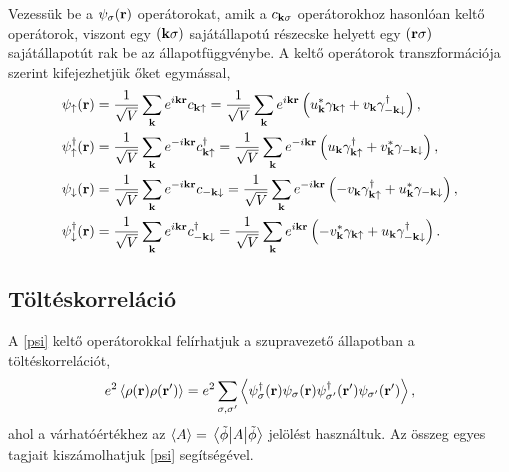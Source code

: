 \documentclass[a4paper,12pt,titlepage]{article}
\newcommand{\KK}{{\vb{k}}}
\newcommand{\RR}{{\vb{r}}}
\begin{document}
Vezessük be a $\psi_\sigma(\RR)$ operátorokat, amik a $c_{\KK \sigma}$ operátorokhoz hasonlóan keltő operátorok, viszont egy $\left( \KK \sigma \right)$ sajátállapotú részecske helyett egy $\left( \RR \sigma \right)$ sajátállapotút rak be az állapotfüggvénybe.  A keltő operátorok transzformációja szerint kifejezhetjük őket egymással,
\begin{equation} \label{psi}
\begin{split}
	\psi_\uparrow(\RR) & = \frac{1}{\sqrt{V}} \sum\limits_\KK e^{i \KK \RR} c_{\KK \uparrow} = \frac{1}{\sqrt{V}} \sum\limits_\KK e^{i \KK \RR} \left( u_\KK^* \gamma_{\KK \uparrow} + v_\KK \gamma_{-\KK \downarrow}^\dagger \right), \\
	\psi_\uparrow^\dagger(\RR) & = \frac{1}{\sqrt{V}} \sum\limits_\KK e^{-i \KK \RR} c_{\KK \uparrow}^\dagger = \frac{1}{\sqrt{V}} \sum\limits_\KK e^{-i \KK \RR} \left( u_\KK \gamma_{\KK \uparrow}^\dagger + v_\KK^* \gamma_{-\KK \downarrow} \right), \\
	\psi_\downarrow(\RR) & = \frac{1}{\sqrt{V}} \sum\limits_\KK e^{-i \KK \RR} c_{-\KK \downarrow} = \frac{1}{\sqrt{V}} \sum\limits_\KK e^{-i \KK \RR} \left( -v_\KK \gamma_{\KK \uparrow}^\dagger + u_\KK^* \gamma_{-\KK \downarrow} \right), \\
	\psi_\downarrow^\dagger(\RR) & = \frac{1}{\sqrt{V}} \sum\limits_\KK e^{i \KK \RR} c_{-\KK \downarrow}^\dagger = \frac{1}{\sqrt{V}} \sum\limits_\KK e^{i \KK \RR} \left( -v_\KK^* \gamma_{\KK \uparrow} + u_\KK \gamma_{-\KK \downarrow}^\dagger \right).
\end{split}
\end{equation}


\subsection{Töltéskorreláció}

A \eqref{psi} keltő operátorokkal felírhatjuk a szupravezető állapotban a töltéskorrelációt,
\begin{equation}
	e^2 \left< \rho(\RR) \rho(\RR^\prime) \right> = e^2 \sum\limits_{\sigma, \sigma^\prime} \left< \psi_\sigma^\dagger(\RR) \psi_\sigma(\RR) \psi_{\sigma^\prime}^\dagger(\RR^\prime) \psi_{\sigma^\prime}(\RR^\prime) \right>,
\end{equation}
ahol a várhatóértékhez az $\left< A \right> = \matrixelement{\tilde{\phi}}{A}{\tilde{\phi}}$ jelölést használtuk.  Az összeg egyes tagjait kiszámolhatjuk \eqref{psi} segítségével.
\end{document}
